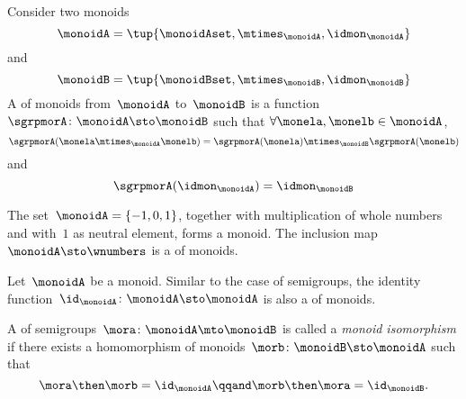 \begin{ctdefinition}
  \label{def:monoid-mor}
  Consider two monoids
  \begin{equation}\label{eq:monoidA}
  \monoidA = \tup{\monoidAset, \mtimes_\monoidA, \idmon_\monoidA}
   \end{equation}
   and
   \begin{equation}\label{eq:monoidA}
   \monoidB = \tup{\monoidBset, \mtimes_\monoidB, \idmon_\monoidB}
   \end{equation}
  A \whomo of monoids from~$\monoidA$ to~$\monoidB$ is a function~$\sgrpmorA \colon \monoidA \sto \monoidB$ such that $ \forall \monela, \monelb \in \monoidA$,
  \begin{equation}
    \label{eq:mon-mor-comp}
    \sgrpmorA (\monela \mtimes_{\monoidA} \monelb) = \sgrpmorA (\monela) \mtimes_{\monoidB}  \sgrpmorA(\monelb)
  \end{equation}
  and
  \begin{equation}
    \label{eq:mon-id-comp}
    \sgrpmorA (\idmon_\monoidA) = \idmon_{\monoidB}
  \end{equation}
\end{ctdefinition}

\begin{example}
  The set~$\monoidA = \{ -1, 0, 1 \}$, together with multiplication of whole numbers and with~$1$ as neutral element, forms a monoid. The inclusion map~$\monoidA \sto \wnumbers$ is a \whomo of monoids.
\end{example}



\begin{definition}
  \label{def:identity-mon-mor}
  Let~$\monoidA$ be a monoid. Similar to the case of semigroups, the identity function~$\id_\monoidA\colon \monoidA \sto \monoidA$ is also a \whomo of monoids.
\end{definition}



\begin{definition}
  \label{def:monoid-iso}
  A \whomo of semigroups~$\mora\colon \monoidA \mto \monoidB$ is called a \emph{monoid isomorphism} if there exists a homomorphism of monoids~$\morb\colon \monoidB \sto \monoidA$ such that
  \begin{equation}
    \mora \then \morb = \id_\monoidA \qqand \morb \then \mora = \id_\monoidB.
  \end{equation}
\end{definition}


